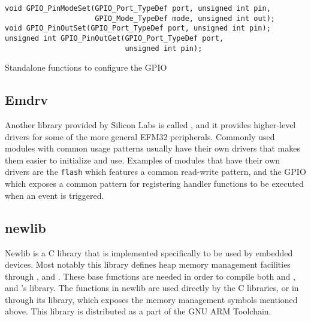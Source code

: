 \begin{listing}[H]
  \begin{verbatim}
void GPIO_PinModeSet(GPIO_Port_TypeDef port, unsigned int pin,
                     GPIO_Mode_TypeDef mode, unsigned int out);
void GPIO_PinOutSet(GPIO_Port_TypeDef port, unsigned int pin);
unsigned int GPIO_PinOutGet(GPIO_Port_TypeDef port,
                            unsigned int pin);
  \end{verbatim}
  \caption{Standalone functions to configure the GPIO}
  \label{lst:back:lib:gpio}
\end{listing}

\subsection{Emdrv}

Another library provided by Silicon Labs is called , and it provides higher-level drivers for some of the more general EFM32 peripherals.
Commonly used modules with common usage patterns usually have their own drivers that makes them easier to initialize and use.
Examples of modules that have their own drivers are the \texttt{flash} which features a common read-write pattern, and the GPIO which exposes a common pattern for registering handler functions to be executed when an event is triggered.

\subsection{newlib}

Newlib is a C library that is implemented specifically to be used by embedded devices.
Most notably this library defines heap memory management facilities through ,  and .
These base functions are needed in order to compile both \emlib and , and {\rust}'s  library.
The functions in newlib are used directly by the C libraries, or in {\rust} through its  library, which exposes the memory management symbols mentioned above.
This library is distributed as a part of the GNU ARM Toolchain.
